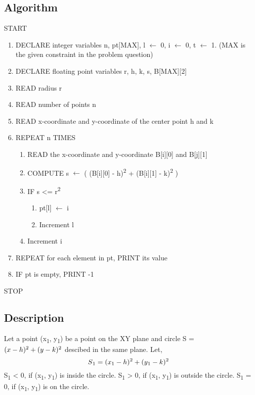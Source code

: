 \documentclass{article}
\begin{document}
\subsection{Algorithm}
START
\begin{flushleft}
\begin{enumerate}
    \item DECLARE integer variables n, pt[MAX], l $\leftarrow$ 0, i $\leftarrow$ 0, t $\leftarrow$ 1. (MAX is the given constraint in the problem question)
    \item DECLARE floating point variables r, h, k, s, B[MAX][2]
    \item READ radius r
    \item READ number of points n
    \item READ x-coordinate and y-coordinate of the center point h and k
    \item REPEAT n TIMES
    \begin{enumerate}
        \item READ the x-coordinate and y-coordinate B[i][0] and B[j][1]
        \item COMPUTE s $\leftarrow$ ( (B[i][0] - h)\textsuperscript{2} + (B[i][1] - k)\textsuperscript{2} )
        \item IF s <= r\textsuperscript{2}
        \begin{enumerate}
            \item pt[l] $\leftarrow$ i
            \item Increment l
        \end{enumerate}
        \item Increment i
    \end{enumerate}
    \item REPEAT for each element in pt, PRINT its value
    \item IF pt is empty, PRINT -1
\end{enumerate}
\end{flushleft}
STOP
\subsection{Description}
Let a point (x\textsubscript{1}, y\textsubscript{1}) be a point on the XY plane and circle S = \( (x - h)\textsuperscript{2} + (y - k)\textsuperscript{2} \) descibed in the same plane. 
Let,
\[S\textsubscript{1} = (x\textsubscript{1} - h)\textsuperscript{2} + (y\textsubscript{1} - k)\textsuperscript{2} \]
S\textsubscript{1} < 0, if (x\textsubscript{1}, y\textsubscript{1}) is inside the circle.\newline
S\textsubscript{1} > 0, if (x\textsubscript{1}, y\textsubscript{1}) is outside the circle.\newline
S\textsubscript{1} = 0, if (x\textsubscript{1}, y\textsubscript{1}) is on the circle.
\end{document}
